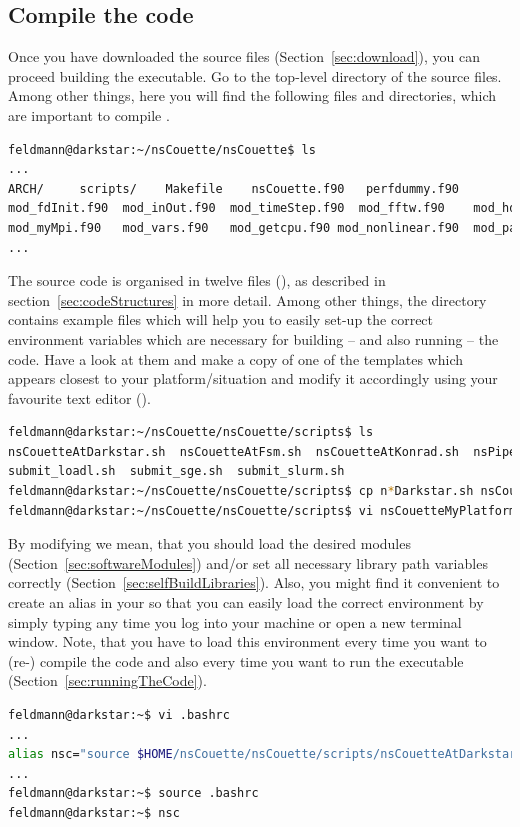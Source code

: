 \documentclass[a4paper, 11pt, DIV=11]{scrartcl}
\begin{document}
\subsection{Compile the code}
\label{sec:compile}

Once you have downloaded the source files (Section~\ref{sec:download}),
you can proceed building the executable. Go to the top-level directory
of the source files. Among other things, here you will find the following
files and directories, which are important to compile \nsc.
\begin{lstlisting}[language=bash]
feldmann@darkstar:~/nsCouette/nsCouette$ ls
...
ARCH/     scripts/    Makefile    nsCouette.f90   perfdummy.f90
mod_fdInit.f90  mod_inOut.f90  mod_timeStep.f90  mod_fftw.f90    mod_hdf5io.f90
mod_myMpi.f90   mod_vars.f90   mod_getcpu.f90 mod_nonlinear.f90  mod_params.f90
...
\end{lstlisting}
The source code is organised in twelve \fortran files (), as
described in section~\ref{sec:codeStructures} in more detail. Among other things,
the directory  contains example files which will help you
to easily set-up the correct environment variables which are necessary for
building -- and also running -- the code. Have a look at them and make a
copy of one of the templates which appears closest to your platform/situation
and modify it accordingly using your favourite text editor (\eg {}).
\begin{lstlisting}[language=bash]
feldmann@darkstar:~/nsCouette/nsCouette/scripts$ ls
nsCouetteAtDarkstar.sh  nsCouetteAtFsm.sh  nsCouetteAtKonrad.sh  nsPipeAtKonrad.sh
submit_loadl.sh  submit_sge.sh  submit_slurm.sh
feldmann@darkstar:~/nsCouette/nsCouette/scripts$ cp n*Darkstar.sh nsCouetteAtMyPlatform.sh
feldmann@darkstar:~/nsCouette/nsCouette/scripts$ vi nsCouetteMyPlatform.sh
\end{lstlisting}
By modifying we mean, that you should load the desired modules
(Section~\ref{sec:softwareModules}) and/or set all necessary
library path variables correctly (Section~\ref{sec:selfBuildLibraries}).
Also, you might find it convenient to create an alias in your
 so that you can easily load the correct environment
by simply typing  any time you log into your machine
or open a new terminal window. Note, that you have to load this
environment every time you want to (re-) compile the code and
also every time you want to run the executable (Section~\ref{sec:runningTheCode}).
\begin{lstlisting}[language=bash]
feldmann@darkstar:~$ vi .bashrc
...
alias nsc="source $HOME/nsCouette/nsCouette/scripts/nsCouetteAtDarkstar.sh"
...
feldmann@darkstar:~$ source .bashrc
feldmann@darkstar:~$ nsc
\end{lstlisting}
\end{document}
